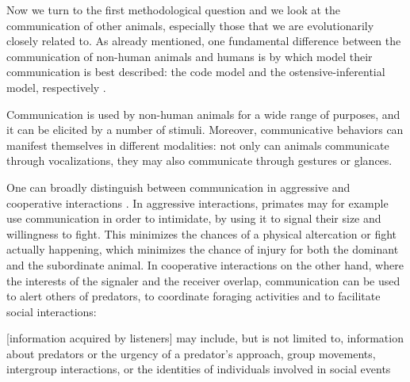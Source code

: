 Now we turn to the first methodological question and we look at the communication of other animals, especially those that we are evolutionarily closely related to.
As already mentioned, one fundamental difference between the communication of non-human animals and humans is by which model their communication is best described: the code model and the ostensive-inferential model, respectively \citep{Scott-Phillips15-primate, Scott-Phillips18-communication}.

Communication is used by non-human animals for a wide range of purposes, and it can be elicited by a number of stimuli. Moreover, communicative behaviors can manifest themselves in different modalities: not only can animals communicate through vocalizations, they may also communicate through gestures or glances.

One can broadly distinguish between communication in aggressive and cooperative interactions \citep{SeyfarthCheney03}. In aggressive interactions, primates may for example use communication in order to intimidate, by using it to signal their size and willingness to fight. This minimizes the chances of a physical altercation or fight actually happening, which minimizes the chance of injury for both the dominant and the subordinate animal.
In cooperative interactions on the other hand, where the interests of the signaler and the receiver overlap, communication can be used to alert others of predators, to coordinate foraging activities and to facilitate social interactions:
\begin{quoting}
    {[information acquired by listeners]} may include, but is not limited to, information about predators or the urgency of a predator’s approach, group movements, intergroup interactions, or the identities of individuals involved in social events
    \hfill \citep[p.~168]{SeyfarthCheney03}
\end{quoting}

